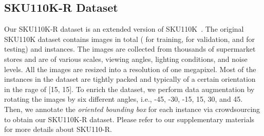 \documentclass[10pt,twocolumn,letterpaper]{article}
\begin{document}
 \subsection{SKU110K-R Dataset}
\label{sec:dataset}
Our SKU110K-R dataset is an extended version of SKU110K~\cite{goldman2019precise}.
The original SKU110K dataset contains  images in total ( for training,  for validation, and  for testing) and  instances.
The images are collected from thousands of supermarket stores and are of various scales, viewing angles, lighting conditions, and noise levels. All the images are resized into a resolution of one megapixel.
Most of the instances in the dataset are tightly packed and typically of a certain orientation in the rage of [15, 15].
To enrich the dataset, we perform data augmentation by rotating the images by six different angles, i.e., -45, -30, -15, 15, 30, and 45.
Then, we annotate the \emph{oriented bounding box} for each instance via crowdsourcing to obtain our SKU110K-R dataset.
Please refer to our supplementary materials for more details about SKU110-R.
\end{document}
